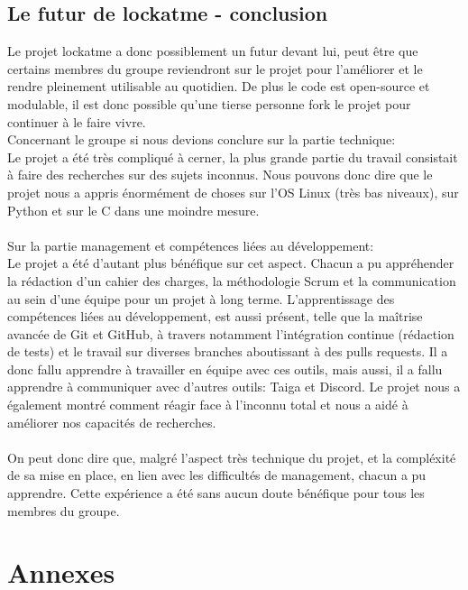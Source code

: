 \documentclass[french]{report}
\begin{document}
\newpage

\section{Le futur de lockatme - conclusion}
Le projet lockatme a donc possiblement un futur devant lui, peut être que certains
membres du groupe reviendront sur le projet pour l'améliorer et le rendre pleinement
utilisable au quotidien. De plus le code est open-source et modulable, il est
donc possible qu'une tierse personne fork le projet pour continuer à le faire vivre.\\

Concernant le groupe si nous devions conclure sur la partie technique:\\
Le projet a été très compliqué à cerner, la plus grande partie du travail consistait
à faire des recherches sur des sujets inconnus. Nous pouvons donc dire que le projet
nous a appris énormément de choses sur l'OS Linux (très bas niveaux), sur Python et sur le C
dans une moindre mesure.
\\\\
Sur la partie management et compétences liées au développement:\\
Le projet a été d'autant plus bénéfique sur cet aspect. Chacun a pu appréhender
la rédaction d'un cahier des charges, la méthodologie Scrum et la communication
au sein d'une équipe pour un projet à long terme. L'apprentissage des compétences liées
au développement, est aussi présent, telle que la maîtrise avancée de Git et GitHub, à travers notamment
l'intégration continue (rédaction de tests) et le travail sur diverses branches aboutissant à des pulls
requests. Il a donc fallu apprendre à travailler en équipe avec ces outils, mais aussi,
il a fallu apprendre à communiquer avec d'autres outils: Taiga et Discord.
Le projet nous a également montré comment réagir face à l'inconnu total et nous
a aidé à améliorer nos capacités de recherches.
\\\\
On peut donc dire que, malgré l'aspect très technique du projet, et la compléxité
de sa mise en place, en lien avec les difficultés de management, chacun a pu apprendre.
Cette expérience a été sans aucun doute bénéfique pour tous les membres du groupe.


\chapter{Annexes}
\newpage
\end{document}
